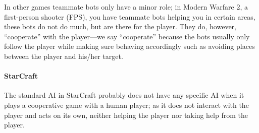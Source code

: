 In other games teammate bots only have a minor role; in Modern Warfare 2\cite{callofduty}, a first-person shooter (FPS), you have teammate bots helping you in certain areas, these bots do not do much, but are there for the player. They do, however, “cooperate” with the player—we say “cooperate” because the bots usually only follow the player while making sure behaving accordingly such as avoiding places between the player and his/her target.

\paragraph{StarCraft}
The standard AI in StarCraft probably does not have any specific AI when it plays a cooperative game with a human player; as it does not interact with the player and acts on its own, neither helping the player nor taking help from the player. 